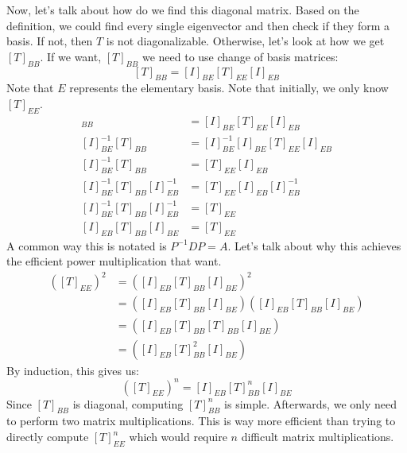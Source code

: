 Now, let's talk about how do we find this diagonal matrix. Based on the definition, we could find every single eigenvector and then check if they form a basis. If not, then $T$ is not diagonalizable. Otherwise, let's look at how we get $[T]_{BB}$. If we want, $[T]_{BB}$ we need to use change of basis matrices:
$$[T]_{BB}=[I]_{BE}[T]_{EE}[I]_{EB}$$
Note that $E$ represents the elementary basis. Note that initially, we only know $[T]_{EE}$.
\begin{align*}
    [T]_{BB}&=[I]_{BE}[T]_{EE}[I]_{EB}\\
    [I]_{BE}^{-1}[T]_{BB}&=[I]_{BE}^{-1}[I]_{BE}[T]_{EE}[I]_{EB}\\
    [I]_{BE}^{-1}[T]_{BB}&=[T]_{EE}[I]_{EB}\\
    [I]_{BE}^{-1}[T]_{BB}[I]_{EB}^{-1}&=[T]_{EE}[I]_{EB}[I]_{EB}^{-1}\\
    [I]_{BE}^{-1}[T]_{BB}[I]_{EB}^{-1}&=[T]_{EE}\\
    [I]_{EB}[T]_{BB}[I]_{BE}&=[T]_{EE}
\end{align*}
A common way this is notated is $P^{-1}DP=A$. Let's talk about why this achieves the efficient power multiplication that want.
\begin{align*}
    ([T]_{EE})^2&=([I]_{EB}[T]_{BB}[I]_{BE})^2\\
    &=([I]_{EB}[T]_{BB}[I]_{BE})([I]_{EB}[T]_{BB}[I]_{BE})\\
    &=([I]_{EB}[T]_{BB}[T]_{BB}[I]_{BE})\\
    &=([I]_{EB}[T]_{BB}^2[I]_{BE})
\end{align*}
By induction, this gives us:
$$([T]_{EE})^n=[I]_{EB}[T]_{BB}^n[I]_{BE}$$
Since $[T]_{BB}$ is diagonal, computing $[T]_{BB}^n$ is simple. Afterwards, we only need to perform two matrix multiplications. This is way more efficient than trying to directly compute $[T]_{EE}^n$ which would require $n$ difficult matrix multiplications.